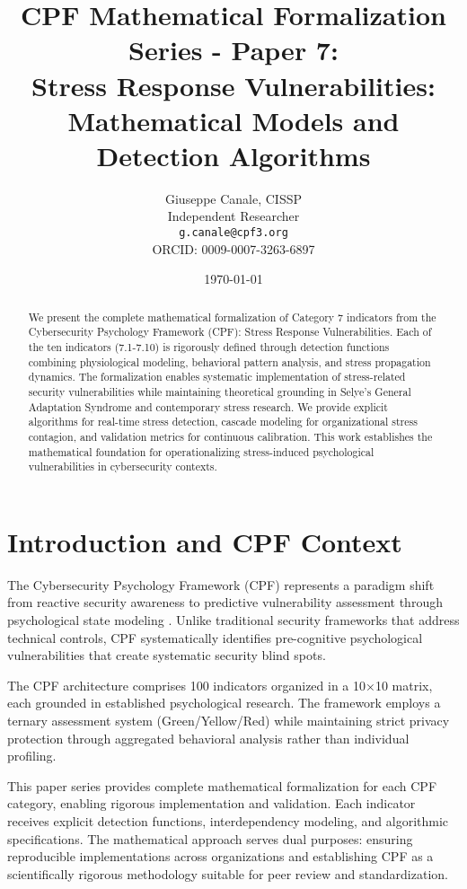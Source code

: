 \documentclass[11pt,a4paper]{article}
\title{CPF Mathematical Formalization Series - Paper 7:\\Stress Response Vulnerabilities: Mathematical Models and Detection Algorithms}
\author{
    Giuseppe Canale, CISSP\\
    Independent Researcher\\
    \texttt{g.canale@cpf3.org}\\
    ORCID: 0009-0007-3263-6897
}
\date{\today}
\begin{document}
\maketitle

\begin{abstract}
We present the complete mathematical formalization of Category 7 indicators from the Cybersecurity Psychology Framework (CPF): Stress Response Vulnerabilities. Each of the ten indicators (7.1-7.10) is rigorously defined through detection functions combining physiological modeling, behavioral pattern analysis, and stress propagation dynamics. The formalization enables systematic implementation of stress-related security vulnerabilities while maintaining theoretical grounding in Selye's General Adaptation Syndrome and contemporary stress research. We provide explicit algorithms for real-time stress detection, cascade modeling for organizational stress contagion, and validation metrics for continuous calibration. This work establishes the mathematical foundation for operationalizing stress-induced psychological vulnerabilities in cybersecurity contexts.
\end{abstract}

\section{Introduction and CPF Context}

The Cybersecurity Psychology Framework (CPF) represents a paradigm shift from reactive security awareness to predictive vulnerability assessment through psychological state modeling \cite{canale2024cpf}. Unlike traditional security frameworks that address technical controls, CPF systematically identifies pre-cognitive psychological vulnerabilities that create systematic security blind spots.

The CPF architecture comprises 100 indicators organized in a 10×10 matrix, each grounded in established psychological research. The framework employs a ternary assessment system (Green/Yellow/Red) while maintaining strict privacy protection through aggregated behavioral analysis rather than individual profiling.

This paper series provides complete mathematical formalization for each CPF category, enabling rigorous implementation and validation. Each indicator receives explicit detection functions, interdependency modeling, and algorithmic specifications. The mathematical approach serves dual purposes: ensuring reproducible implementations across organizations and establishing CPF as a scientifically rigorous methodology suitable for peer review and standardization.
\end{document}
